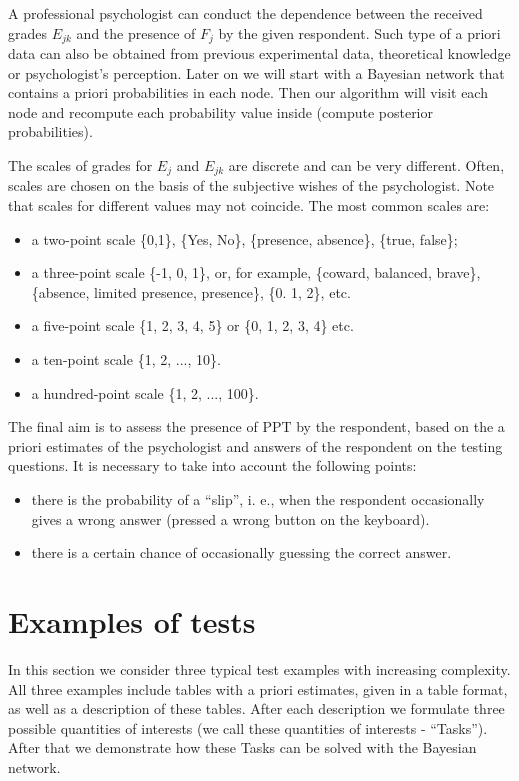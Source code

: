\documentclass[12pt]{article}
\begin{document}
A professional psychologist can conduct the dependence between the received grades $E_{jk}$ and the presence of $F_j$ by the given respondent. Such type of a priori data can also be obtained from previous experimental data, theoretical knowledge or psychologist's perception. Later on we will start with a Bayesian network that contains a priori probabilities in each node. Then our algorithm will visit each node and recompute each probability value inside (compute posterior probabilities). 
 
The scales of grades for $E_j$ and $E_{jk}$ are discrete and can be very different. Often, scales are chosen on the basis of the subjective wishes of the psychologist. Note that scales for different values may not coincide. The most common scales are:
\begin{itemize}	
\item a two-point scale \{0,1\}, \{Yes, No\}, \{presence, absence\}, \{true, false\};
\item a three-point scale \{-1, 0, 1\}, or, for example, \{coward, balanced, brave\}, \{absence, limited presence, presence\}, \{0. 1, 2\}, etc.
\item a five-point scale \{1, 2, 3, 4, 5\} or \{0, 1, 2, 3, 4\} etc. 
\item a ten-point scale \{1, 2, ..., 10\}. 
\item a hundred-point scale \{1, 2, ..., 100\}. 
\end{itemize}

The final aim is to assess the presence of PPT by the respondent, based on the a priori estimates of the psychologist and answers of the respondent on the testing questions. It is necessary to take into account the following points:
\begin{itemize}	
\item there is the probability of a ``slip'', i. e., when the respondent occasionally gives a wrong answer (pressed a wrong button on the keyboard). 
\item there is a certain chance of occasionally guessing the correct answer.
\end{itemize}
%
%
\section{Examples of tests}
\label{sec:ExamplesTasks}
In this section we consider three typical test examples with increasing complexity. All three examples include tables with a priori estimates, given in a table format, as well as a description of these tables.
After each description we formulate three possible quantities of interests (we call these quantities of interests - ``Tasks''). After that we demonstrate how these Tasks can be solved with the Bayesian network.
 
\end{document}
